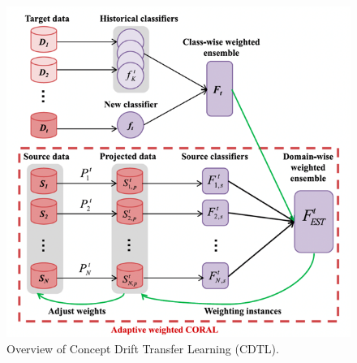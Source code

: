     \begin{figure}[!ht]    
        \begin{center}
            \includegraphics[width=.85\textwidth]{3_State-of-the-art/fig/cdtl.png} 
        \end{center}
        \caption{Overview of Concept Drift Transfer Learning (CDTL).}
        \label{cdtl_fig}

        \end{figure}

